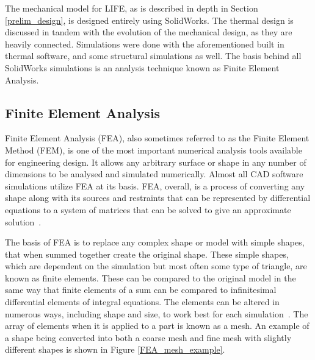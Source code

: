 The mechanical model for LIFE, as is described in depth in Section \ref{prelim_design}, is designed entirely using SolidWorks. The thermal design is discussed in tandem with the evolution of the mechanical design, as they are heavily connected. Simulations were done with the aforementioned built in thermal software, and some structural simulations as well. The basis behind all SolidWorks simulations is an analysis technique known as Finite Element Analysis.

\subsection{Finite Element Analysis} \label{FEA}
Finite Element Analysis (FEA), also sometimes referred to as the Finite Element Method (FEM), is one of the most important numerical analysis tools available for engineering design. It allows any arbitrary surface or shape in any number of dimensions to be analysed and simulated numerically. Almost all CAD software simulations utilize FEA at its basis. FEA, overall, is a process of converting any shape along with its sources and restraints that can be represented by differential equations to a system of matrices that can be solved to give an approximate solution~\citep{FEA_SW}.

The basis of FEA is to replace any complex shape or model with simple shapes, that when summed together create the original shape. These simple shapes, which are dependent on the simulation but most often some type of triangle, are known as finite elements. These can be compared to the original model in the same way that finite elements of a sum can be compared to infinitesimal differential elements of integral equations. The elements can be altered in numerous ways, including shape and size, to work best for each simulation~\citep{FEA_SW}. The array of elements when it is applied to a part is known as a mesh. An example of a shape being converted into both a coarse mesh and fine mesh with slightly different shapes is shown in Figure \ref{FEA_mesh_example}.

